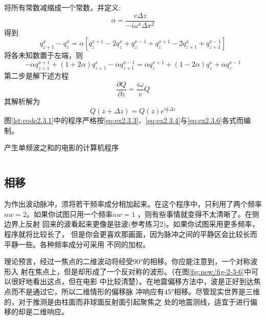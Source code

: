将所有常数减缩成一个常数，并定义:
\begin{equation}
\alpha=\frac{v\Delta z}{-i\omega^4\Delta x^2}
\label{eq:ex2.3.3}
\end{equation}
得到
\begin{equation*}
q_{z+1}^x-q_z^x=\alpha[q_z^{x+1}-2q_z^x+q_z^{x-1}+q_z^{x+1}-2q_{z+1}^x+q_{z+1}^{x-1}]
\end{equation*}
将各未知数置于左端，则
\begin{equation}
-\alpha q_{z+1}^{x+1}+(1+2\alpha)q_{z+1}^x-\alpha q_{z+1}^{x-1}=\alpha q_z^{x+1}+(1-2\alpha)q_z^x+
\alpha q_z^{x-1}
\label{eq:ex2.3.4}
\end{equation}
第二步是解下述方程
\begin{equation}
\frac{\partial Q}{\partial z}=\frac{i\omega}{v}Q
\label{eq:ex2.3.5}
\end{equation}
其解析解为
\begin{equation}
Q(z+\Delta z)=Q(z)e^{i\frac{\omega}{v}\Delta z}
\label{eq:ex2.3.6}
\end{equation}
图\ref{lst:code2.3.1}中的程序严格按\ref{eq:ex2.3.3}、\ref{eq:ex2.3.4}与\ref{eq:ex2.3.6}各式而编制。
\begin{listing}[H]
  \caption{产生单频波之和的电影的计算机程序}
  \inputminted{Fortran}{timespace/code2-3-1.f90}
  \label{lst:code2.3.1}
\end{listing}
\subsection{相移}
为作出波动脉冲，须将若干频率成分相加起来。在这个程序中，只利用了两个频率
$nw=2$。如果你试图只用一个频率$nw =1$
，则有些事情就变得不太清晰了。在侧边界上反射
回来的波看起来更像是驻波(参考练习2)。如果你试图采用更多频率，程序就将比较长了，
但是你会更喜欢那画面，因为脉冲之间的平静区会比较长而平静一些。各种频率成分可采用
不同的加权。

理论预言，经过一焦点的二维波动将经受90°的相移。你应能注意到，一个对称波形入
射在焦点上，但是却形成了一个反对称的波形。（在图\ref{fig:new/fig-2-3-6}中可以很好地看出这点，但在电影
中比较清楚）。在地震偏移方法中，波是正好到达焦点而不是通过它，所以二维情形的偏移脉
冲响应有45°相移。尽管现实世界是三维的，对于推测是由柱面而非球面反射面引起聚焦之
处的地震测线，适宜于进行偏移的却是二维响应。

